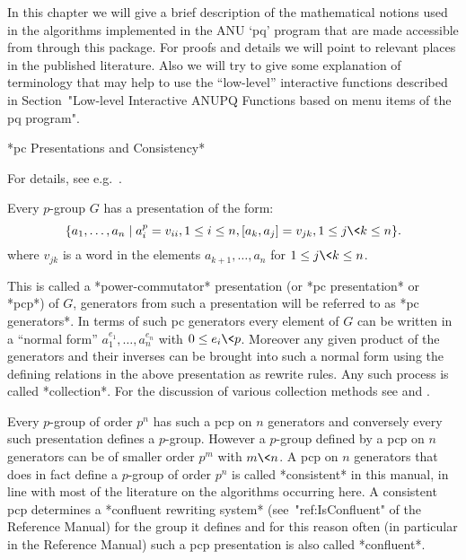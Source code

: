 

In this chapter we will give a brief description of  the  mathematical
notions used in the algorithms implemented in  the  ANU  `pq'  program
that are made accessible from {\GAP} through this package. For  proofs
and details  we  will  point  to  relevant  places  in  the  published
literature. Also we will try to give some explanation  of  terminology
that may help to use the ``low-level'' interactive functions described
in Section~"Low-level Interactive ANUPQ Functions based on menu  items
of the pq program".


*pc Presentations and Consistency*

For details, see e.g.~\cite{NNN98}.

Every $p$-group $G$ has a presentation of the form: 
$$
\{a_1,\dots,a_n \mid a_i^p = v_{ii}, 1 \le i \le n, 
               [a_k, a_j] = v_{jk}, 1 \le j \< k \le n \}.  
$$
where $v_{jk}$ is a word in the elements $a_{k+1},\dots,a_n$ for 
$1 \le j \< k \le n$.

This is called a *power-commutator* presentation (or *pc presentation*
or *pcp*) of $G$, generators from such a presentation will be referred
to as *pc generators*. In terms of such pc generators every element of
$G$ can be written in a  ``normal  form''  $a_1^{e_1},\dots,a_n^{e_n}$
with $0 \le e_i \< p$. Moreover any given product  of  the  generators
and their inverses can be brought into such a normal  form  using  the
defining relations in the above presentation  as  rewrite  rules.  Any
such process is called *collection*. For  the  discussion  of  various
collection methods see \cite{LGS90} and \cite{VL90a}.

Every $p$-group of order $p^n$ has such a pcp on  $n$  generators  and
conversely every such presentation  defines  a  $p$-group.  However  a
$p$-group defined by a pcp on $n$ generators can be of  smaller  order
$p^m$ with $m\<n$. A pcp on $n$ generators that does in fact define  a
$p$-group of order $p^n$ is called *consistent*  in  this  manual,  in
line with most of the literature on the algorithms occurring  here.  A
consistent   pcp   determines   a   *confluent    rewriting    system*
(see~"ref:IsConfluent" of the {\GAP} Reference Manual) for  the  group
it defines and for this reason often  (in  particular  in  the  {\GAP}
Reference Manual) such a pcp presentation is also called *confluent*.

